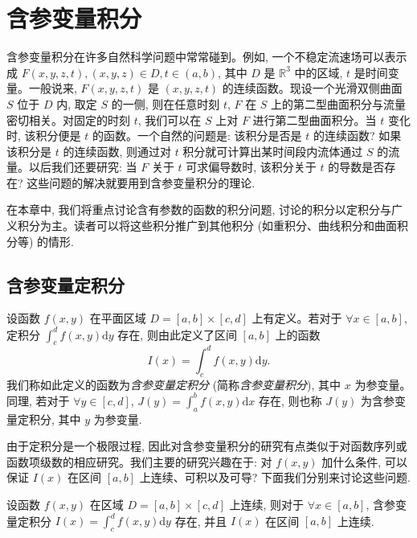 \setcounter{chapter}{16} %
\chapter{含参变量积分}
\label{chap:ma-17}

含参变量积分在许多自然科学问题中常常碰到。例如, 一个不稳定流速场可以表示成 $F(x,y,z,t),(x,y,z)\in D,t\in(a,b)$, 其中 $D$ 是 $\mathbb R^3$ 中的区域, $t$ 是时间变量。一般说来, $F(x,y,z,t)$ 是 $(x,y,z,t)$ 的连续函数。现设一个光滑双侧曲面 $S$ 位于 $D$ 内, 取定 $S$ 的一侧, 则在任意时刻 $t$, $F$ 在 $S$ 上的第二型曲面积分与流量密切相关。对固定的时刻 $t$, 我们可以在 $S$ 上对 $F$ 进行第二型曲面积分。当 $t$ 变化时, 该积分便是 $t$ 的函数。一个自然的问题是: 该积分是否是 $t$ 的连续函数? 如果该积分是 $t$ 的连续函数, 则通过对 $t$ 积分就可计算出某时间段内流体通过 $S$ 的流量。以后我们还要研究: 当 $F$ 关于 $t$ 可求偏导数时, 该积分关于 $t$ 的导数是否存在? 这些问题的解决就要用到含参变量积分的理论.

在本章中, 我们将重点讨论含有参数的函数的积分问题, 讨论的积分以定积分与广义积分为主。读者可以将这些积分推广到其他积分 (如重积分、曲线积分和曲面积分等) 的情形.

\section{含参变量定积分}
\label{sec:ma-17-1}

设函数 $f(x,y)$ 在平面区域 $D=[a,b]\times[c,d]$ 上有定义。若对于 $\forall x\in[a,b]$, 定积分 $\int_c^d f(x,y)\mathrm dy$ 存在, 则由此定义了区间 $[a,b]$ 上的函数
\[
  I(x)=\int_c^d f(x,y)\mathrm dy.
\]
我们称如此定义的函数为\emph{含参变量定积分} (简称\emph{含参变量积分}), 其中 $x$ 为参变量。同理, 若对于 $\forall y\in[c,d]$, $J(y)=\int_a^b f(x,y)\mathrm dx$ 存在, 则也称 $J(y)$ 为含参变量定积分, 其中 $y$ 为参变量.

由于定积分是一个极限过程, 因此对含参变量积分的研究有点类似于对函数序列或函数项级数的相应研究。我们主要的研究兴趣在于: 对 $f(x,y)$ 加什么条件, 可以保证 $I(x)$ 在区间 $[a,b]$ 上连续、可积以及可导? 下面我们分别来讨论这些问题.

\begin{theorem}\label{theorem:ma-17-1-1}
设函数 $f(x,y)$ 在区域 $D=[a,b]\times[c,d]$ 上连续, 则对于 $\forall x\in[a,b]$, 含参变量定积分 $I(x)=\int_c^d f(x,y)\mathrm dy$ 存在, 并且 $I(x)$ 在区间 $[a,b]$ 上连续.
\end{theorem}


